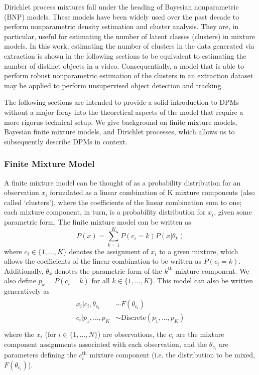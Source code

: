\documentclass[smallcondensed, final]{svjour3}
\begin{document}
Dirichlet process mixtures fall under the heading of Bayesian nonparametric (BNP) models. These models have been widely used over the past decade to perform nonparametric density estimation and cluster analysis. They are, in particular, useful for estimating the number of latent classes (clusters) in mixture models. In this work, estimating the number of clusters in the data generated via extraction is shown in the following sections to be equivalent to estimating the number of distinct objects in a video. Consequentially, a model that is able to perform robust nonparametric estimation of the clusters in an extraction dataset may be applied to perform unsupervised object detection and tracking.

The following sections are intended to provide a solid introduction to DPMs without a major foray into the theoretical aspects of the model that require a more rigorus technical setup. We give background on finite mixture models, Bayesian finite mixture models, and Dirichlet processes, which allows us to subsequently describe DPMs in context. 


\subsubsection{Finite Mixture Model}

A finite mixture model can be thought of as a probability distribution for an observation $x_{i}$ formulated as a linear combination of K mixture components (also called `clusters'), where the coefficients of the linear combination sum to one; each mixture component, in turn, is a probability distribution for $x_{i}$, given some parametric form. The finite mixture model can be written as
\begin{equation}
P(x) = \sum_{k=1}^{K} P(c_{i} = k)P(x|\theta_{k})
\end{equation}
where $c_{i} \in \{ 1, \ldots, K \}$ denotes the assignment of $x_{i}$ to a given mixture, which allows the coefficients of the linear combination to be written as $P(c_{i} = k)$. Additionally, $\theta_{k}$ denotes the parametric form of the $k^{\text{th}}$ mixture component. We also define $p_{k} = P(c_{i} = k)$ for all $k \in \{ 1, \ldots, K \} $. This model can also be written generatively as
\begin{align}
\begin{split}
	x_{i}|c_{i}, \theta_{c_{i}}  &\sim  F(\theta_{c_{i}}) \\
	c_{i}|p_{1}, \ldots, p_{K}  &\sim  \text{Discrete}(p_{1}, \ldots, p_{K}) \\
\end{split}
\end{align}
where the $x_{i}$ (for $i \in \{ 1, \ldots, N \}$) are observations, the $c_{i}$ are the mixture component assignments associated with each observation, and the $\theta_{c_{i}}$ are parameters defining the $c_{i}^{\text{th}}$ mixture component (i.e. the distribution to be mixed, $F(\theta_{c_{i}})$).
\end{document}
